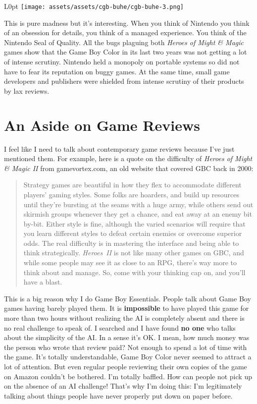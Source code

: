 \documentclass{book}
\begin{document}
\begin{wrapfigure}{L}{0pt} \texttt{[image: assets/assets/cgb-buhe/cgb-buhe-3.png]}\end{wrapfigure}
This is pure madness but it’s interesting. When you think of Nintendo you think of an obsession for details, you think of a managed experience. You think of the Nintendo Seal of Quality. All the bugs plaguing both \emph{Heroes of Might \& Magic} games show that the Game Boy Color in its last two years was not getting a lot of intense scrutiny. Nintendo held a monopoly on portable systems so did not have to fear its reputation on buggy games. At the same time, small game developers and publishers were shielded from intense scrutiny of their products by lax reviews.

\FloatBarrier\needspace{5pt}\section*{An Aside on Game Reviews}\nopagebreak[4]

I feel like I need to talk about contemporary game reviews because I’ve just mentioned them. For example, here is a quote on the difficulty of \emph{Heroes of Might \& Magic II} from gamevortex.com, an old website that covered GBC back in 2000:

\begin{quote}
Strategy games are beautiful in how they flex to accommodate different players’ gaming styles. Some folks are hoarders, and build up resources until they’re bursting at the seams with a huge army, while others send out skirmish groups whenever they get a chance, and eat away at an enemy bit by-bit. Either style is fine, although the varied scenarios will require that you learn different styles to defeat certain enemies or overcome superior odds. The real difficulty is in mastering the interface and being able to think strategically. \emph{Heroes II} is not like many other games on GBC, and while some people may see it as close to an RPG, there’s way more to think about and manage. So, come with your thinking cap on, and you’ll have a blast.
\end{quote} \par

This is a big reason why I do Game Boy Essentials. People talk about Game Boy games having barely played them. It is \textbf{impossible} to have played this game for more than two hours without realizing the AI is completely absent and there is no real challenge to speak of. I searched and I have found \textbf{no one} who talks about the simplicity of the AI. In a sense it’s OK. I mean, how much money was the person who wrote that review paid? Not enough to spend a lot of time with the game. It’s totally understandable, Game Boy Color never seemed to attract a lot of attention. But even regular people reviewing their own copies of the game on Amazon couldn’t be bothered. I’m totally baffled. How can people not pick up on the absence of an AI challenge! That’s why I’m doing this: I’m legitimately talking about things people have never properly put down on paper before.
\end{document}
